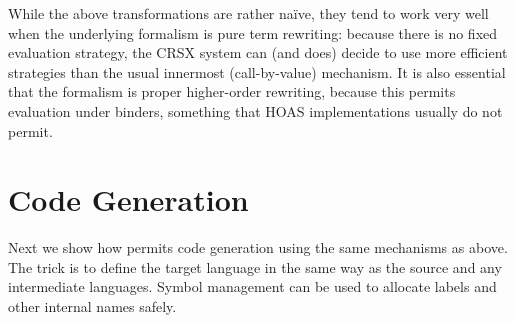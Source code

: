 \documentclass[letterpaper]{article}
\begin{document}
While the above transformations are rather naïve, they tend to work very well when the underlying
formalism is pure term rewriting: because there is no fixed evaluation strategy, the CRSX system can
(and does) decide to use more efficient strategies than the usual innermost (call-by-value)
mechanism. It is also essential that the formalism is proper higher-order rewriting, because this
permits evaluation under binders, something that HOAS implementations usually do not permit.


\section{Code Generation}
\label{sec:cogen}

Next we show how \HAX permits code generation using the same mechanisms as above. The trick is to
define the target language in the same way as the source and any intermediate languages. Symbol
management can be used to allocate labels and other internal names safely.
\end{document}
